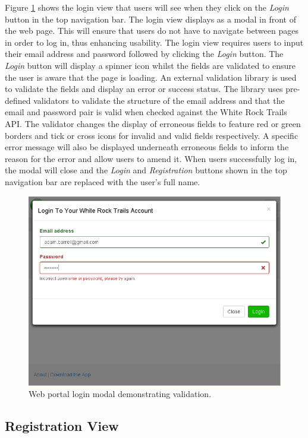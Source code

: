 \documentclass[11pt,a4paper]{article}
\begin{document}
Figure \ref{fig:login} shows the login view that users will see when they click on the \emph{Login} button in the top navigation bar. The login view displays as a modal in front of the web page. This will ensure that users do not have to navigate between pages in order to log in, thus enhancing usability. The login view requires users to input their email address and password followed by clicking the \emph{Login} button. The \emph{Login} button will display a spinner icon whilst the fields are validated to ensure the user is aware that the page is loading. An external validation library is used to validate the fields and display an error or success status. The library uses pre-defined validators to validate the structure of the email address and that the email and password pair is valid when checked against the White Rock Trails API. The validator changes the display of erroneous fields to feature red or green borders and tick or cross icons for invalid and valid fields respectively. A specific error message will also be displayed underneath erroneous fields to inform the reason for the error and allow users to amend it. When users successfully log in, the modal will close and the \emph{Login} and \emph{Registration} buttons shown in the top navigation bar are replaced with the user's full name.

\begin{figure}[H]
\centering
\includegraphics[width=0.8\linewidth]{./img/webportal/login}
\caption{Web portal login modal demonstrating validation.}
\label{fig:login}
\end{figure}

\subsection{Registration View}
\end{document}
